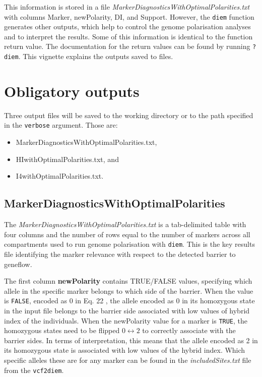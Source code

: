 \documentclass[
]{book}
\providecommand{\tightlist}{%
  \setlength{\itemsep}{0pt}\setlength{\parskip}{0pt}}
\begin{document}
This information is stored in a file \emph{MarkerDiagnosticsWithOptimalPolarities.txt} with columns Marker, newPolarity, DI, and Support. However, the \texttt{diem} function generates other outputs, which help to control the genome polarisation analyses and to interpret the results. Some of this information is identical to the function return value. The documentation for the return values can be found by running \texttt{?diem}. This vignette explains the outputs saved to files.

\section{Obligatory outputs}\label{defaults}

Three output files will be saved to the working directory or to the path specified in the \texttt{verbose} argument. Those are:

\begin{itemize}
\tightlist
\item
  MarkerDiagnosticsWithOptimalPolarities.txt,
\item
  HIwithOptimalPolarities.txt, and
\item
  I4withOptimalPolarities.txt.
\end{itemize}

\subsection{MarkerDiagnosticsWithOptimalPolarities}\label{markerDiagnostics}

The \emph{MarkerDiagnosticsWithOptimalPolarities.txt} is a tab-delimited table with four columns and the number of rows equal to the number of markers across all compartments used to run genome polarisation with \texttt{diem}. This is the key results file identifying the marker relevance with respect to the detected barrier to geneflow.

The first column \textbf{newPolarity} contains TRUE/FALSE values, specifying which allele in the specific marker belongs to which side of the barrier. When the value is \texttt{FALSE}, encoded as 0 in Eq. 22 \citep{Baird2023}, the allele encoded as 0 in its homozygous state in the input file belongs to the barrier side associated with low values of hybrid index of the individuals. When the newPolarity value for a marker is \texttt{TRUE}, the homozygous states need to be flipped \(0 \leftrightarrow 2\) to correctly associate with the barrier sides. In terms of interpretation, this means that the allele encoded as 2 in its homozygous state is associated with low values of the hybrid index. Which specific alleles these are for any marker can be found in the \emph{includedSites.txt} file from the \texttt{vcf2diem}.
\end{document}
